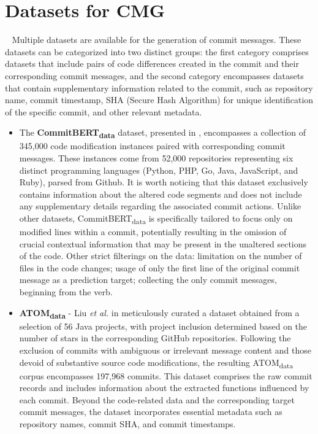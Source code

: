 \section{Datasets for CMG}~\label{sec:datasets}
Multiple datasets are available for the generation of commit messages. These datasets can be categorized into two distinct groups: the first category comprises datasets that include pairs of code differences created in the commit and their corresponding commit messages, and the second category encompasses datasets that contain supplementary information related to the commit, such as repository name, commit timestamp, SHA (Secure Hash Algorithm) for unique identification of the specific commit, and other relevant metadata.
\begin{itemize}
    \item The \textbf{CommitBERT\textsubscript{data}} dataset, presented in{ }\cite{jung2021commitbert}, encompasses a collection of 345,000 code modification instances paired with corresponding commit messages. These instances come from 52,000 repositories representing six distinct programming languages (Python, PHP, Go, Java, JavaScript, and Ruby), parsed from Github. It is worth noticing that this dataset exclusively contains information about the altered code segments and does not include any supplementary details regarding the associated commit actions. Unlike other datasets, CommitBERT\textsubscript{data} is specifically tailored to focus only on modified lines within a commit, potentially resulting in the omission of crucial contextual information that may be present in the unaltered sections of the code. Other strict filterings on the data: limitation on the number of files in the code changes; usage of only the first line of the original commit message as a prediction target; collecting the only commit messages, beginning from the verb.

    \item \textbf{ATOM\textsubscript{data}} {-} Liu \textit{et al.} in { }\cite{liu2020atom} meticulously curated a dataset obtained from a selection of 56 Java projects, with project inclusion determined based on the number of stars in the corresponding GitHub repositories. Following the exclusion of commits with ambiguous or irrelevant message content and those devoid of substantive source code modifications, the resulting ATOM\textsubscript{data} corpus encompasses 197,968 commits. This dataset comprises the raw commit records and includes information about the extracted functions influenced by each commit. Beyond the code-related data and the corresponding target commit messages, the dataset incorporates essential metadata such as repository names, commit SHA, and commit timestamps.
    

\end{itemize}
